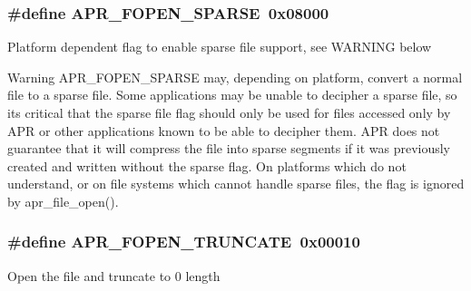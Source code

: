 \subsubsection[{\texorpdfstring{A\+P\+R\+\_\+\+F\+O\+P\+E\+N\+\_\+\+S\+P\+A\+R\+SE}{APR_FOPEN_SPARSE}}]{\setlength{\rightskip}{0pt plus 5cm}\#define A\+P\+R\+\_\+\+F\+O\+P\+E\+N\+\_\+\+S\+P\+A\+R\+SE~0x08000}\hypertarget{group__apr__file__open__flags_ga0d155e9bb7fbf1a5cd4e84b5ede059f4}{}\label{group__apr__file__open__flags_ga0d155e9bb7fbf1a5cd4e84b5ede059f4}
Platform dependent flag to enable sparse file support, see W\+A\+R\+N\+I\+NG below

\begin{DoxyWarning}{Warning}
A\+P\+R\+\_\+\+F\+O\+P\+E\+N\+\_\+\+S\+P\+A\+R\+SE may, depending on platform, convert a normal file to a sparse file. Some applications may be unable to decipher a sparse file, so it\textquotesingle{}s critical that the sparse file flag should only be used for files accessed only by A\+PR or other applications known to be able to decipher them. A\+PR does not guarantee that it will compress the file into sparse segments if it was previously created and written without the sparse flag. On platforms which do not understand, or on file systems which cannot handle sparse files, the flag is ignored by apr\+\_\+file\+\_\+open(). 
\end{DoxyWarning}
\subsubsection[{\texorpdfstring{A\+P\+R\+\_\+\+F\+O\+P\+E\+N\+\_\+\+T\+R\+U\+N\+C\+A\+TE}{APR_FOPEN_TRUNCATE}}]{\setlength{\rightskip}{0pt plus 5cm}\#define A\+P\+R\+\_\+\+F\+O\+P\+E\+N\+\_\+\+T\+R\+U\+N\+C\+A\+TE~0x00010}\hypertarget{group__apr__file__open__flags_ga09b05a5bd5db534b93794f7657bcb146}{}\label{group__apr__file__open__flags_ga09b05a5bd5db534b93794f7657bcb146}
Open the file and truncate to 0 length 
